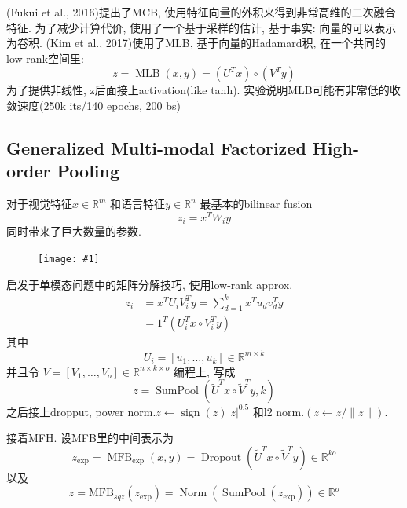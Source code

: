 \documentclass{article}
\newcommand{\cfig}[1]{
    \begin{figure}[htbp]
    \centering
    \texttt{[image: \#1]}
\end{figure}
}
\begin{document}
(Fukui et al., 2016)提出了MCB, 使用特征向量的外积来得到非常高维的二次融合特征. 为了减少计算代价, 使用了一个基于采样的估计, 基于事实: 向量的可以表示为卷积. (Kim et al., 2017)使用了MLB, 基于向量的Hadamard积, 在一个共同的low-rank空间里:
\begin{equation}
    z=\operatorname{MLB}(x, y)=\left(U^{T} x\right) \circ\left(V^{T} y\right)
\end{equation}
为了提供非线性, z后面接上activation(like tanh).
实验说明MLB可能有非常低的收敛速度(250k its/140 epochs, 200 bs)

\subsection{Generalized Multi-modal Factorized High-order Pooling}

对于视觉特征$x \in \mathbb{R}^{m}$
和语言特征$y \in \mathbb{R}^{n}$
最基本的bilinear fusion
\begin{equation}
    z_{i}=x^{T} W_{i} y
\end{equation}
同时带来了巨大数量的参数.

\cfig{mfb-arch.png}

启发于单模态问题中的矩阵分解技巧, 使用low-rank approx.
\begin{equation}
    \begin{aligned}
    z_{i} &=x^{T} U_{i} V_{i}^{T} y=\sum_{d=1}^{k} x^{T} u_{d} v_{d}^{T} y \\
    &=1^{T}\left(U_{i}^{T} x \circ V_{i}^{T} y\right)
    \end{aligned}
\end{equation}
其中
\begin{equation}
    U_{i}=\left[u_{1}, \ldots, u_{k}\right] \in \mathbb{R}^{m \times k}
\end{equation}
并且令
$V=\left[V_{1}, \ldots, V_{o}\right] \in \mathbb{R}^{n \times k \times o}$
编程上, 写成
\begin{equation}
    z=\operatorname{SumPool}\left(\tilde{U}^{T} x \circ \tilde{V}^{T} y, k\right)
\end{equation}
之后接上dropput, power norm.$z \leftarrow \operatorname{sign}(z)|z|^{0.5}$
和l2 norm.$(z \leftarrow z /\|z\|)$.

接着MFH. 设MFB里的中间表示为
\begin{equation}
    z_{\exp }=\operatorname{MFB}_{\exp }(x, y)=\operatorname{Dropout}\left(\tilde{U}^{T} x \circ \tilde{V}^{T} y\right) \in \mathbb{R}^{k o}
\end{equation}
以及
\begin{equation}
    z=\mathrm{MFB}_{s q z}\left(z_{\exp }\right)=\operatorname{Norm}\left(\operatorname{SumPool}\left(z_{\exp }\right)\right) \in \mathbb{R}^{o}
\end{equation}
\end{document}
